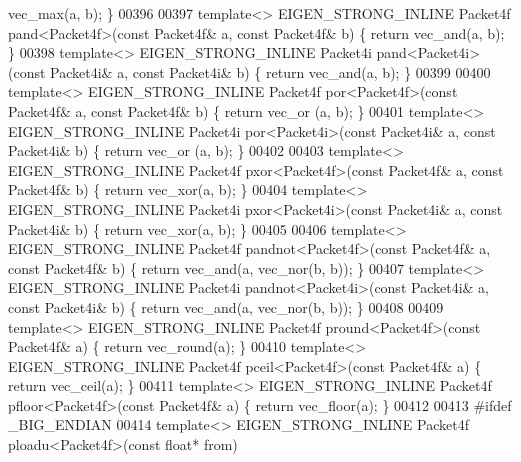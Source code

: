 \begin{DoxyCode}
{      vec\_max(a, b); \}
00396 
00397 \textcolor{keyword}{template}<> EIGEN\_STRONG\_INLINE Packet4f pand<Packet4f>(\textcolor{keyword}{const} Packet4f& a, \textcolor{keyword}{const} Packet4f& b) \{ \textcolor{keywordflow}{return} 
      vec\_and(a, b); \}
00398 \textcolor{keyword}{template}<> EIGEN\_STRONG\_INLINE Packet4i pand<Packet4i>(\textcolor{keyword}{const} Packet4i& a, \textcolor{keyword}{const} Packet4i& b) \{ \textcolor{keywordflow}{return} 
      vec\_and(a, b); \}
00399 
00400 \textcolor{keyword}{template}<> EIGEN\_STRONG\_INLINE Packet4f por<Packet4f>(\textcolor{keyword}{const} Packet4f& a, \textcolor{keyword}{const} Packet4f& b) \{ \textcolor{keywordflow}{return} vec\_or
      (a, b); \}
00401 \textcolor{keyword}{template}<> EIGEN\_STRONG\_INLINE Packet4i por<Packet4i>(\textcolor{keyword}{const} Packet4i& a, \textcolor{keyword}{const} Packet4i& b) \{ \textcolor{keywordflow}{return} vec\_or
      (a, b); \}
00402 
00403 \textcolor{keyword}{template}<> EIGEN\_STRONG\_INLINE Packet4f pxor<Packet4f>(\textcolor{keyword}{const} Packet4f& a, \textcolor{keyword}{const} Packet4f& b) \{ \textcolor{keywordflow}{return} 
      vec\_xor(a, b); \}
00404 \textcolor{keyword}{template}<> EIGEN\_STRONG\_INLINE Packet4i pxor<Packet4i>(\textcolor{keyword}{const} Packet4i& a, \textcolor{keyword}{const} Packet4i& b) \{ \textcolor{keywordflow}{return} 
      vec\_xor(a, b); \}
00405 
00406 \textcolor{keyword}{template}<> EIGEN\_STRONG\_INLINE Packet4f pandnot<Packet4f>(\textcolor{keyword}{const} Packet4f& a, \textcolor{keyword}{const} Packet4f& b) \{ \textcolor{keywordflow}{return} 
      vec\_and(a, vec\_nor(b, b)); \}
00407 \textcolor{keyword}{template}<> EIGEN\_STRONG\_INLINE Packet4i pandnot<Packet4i>(\textcolor{keyword}{const} Packet4i& a, \textcolor{keyword}{const} Packet4i& b) \{ \textcolor{keywordflow}{return} 
      vec\_and(a, vec\_nor(b, b)); \}
00408 
00409 \textcolor{keyword}{template}<> EIGEN\_STRONG\_INLINE Packet4f pround<Packet4f>(\textcolor{keyword}{const} Packet4f& a) \{ \textcolor{keywordflow}{return} vec\_round(a); \}
00410 \textcolor{keyword}{template}<> EIGEN\_STRONG\_INLINE Packet4f pceil<Packet4f>(\textcolor{keyword}{const}  Packet4f& a) \{ \textcolor{keywordflow}{return} vec\_ceil(a); \}
00411 \textcolor{keyword}{template}<> EIGEN\_STRONG\_INLINE Packet4f pfloor<Packet4f>(\textcolor{keyword}{const} Packet4f& a) \{ \textcolor{keywordflow}{return} vec\_floor(a); \}
00412 
00413 \textcolor{preprocessor}{#ifdef \_BIG\_ENDIAN}
00414 \textcolor{keyword}{template}<> EIGEN\_STRONG\_INLINE Packet4f ploadu<Packet4f>(\textcolor{keyword}{const} \textcolor{keywordtype}{float}* from)
}
\end{DoxyCode}
